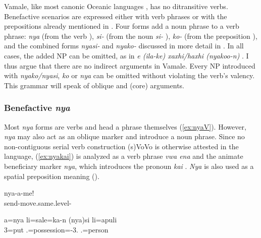 Vamale, like most canonic Oceanic languages \parencite[510]{ross_morphosyntactic_2004}, has no ditransitive verbs. Benefactive scenarios are expressed either with verb phrases or with the prepositions already mentioned in . Four forms add a noun phrase to a verb phrase: \textit{nya}  (from the verb ), \textit{si-}  (from the noun \textit{si-} ), \textit{ko-}  (from the preposition ), and the combined forms \textit{nyasi-} and \textit{nyako-}  discussed in more detail in . In all cases, the added NP can be omitted, as in \textit{e (ila-ke) xaxhi/haxhi (nyakoo-n)} . I thus argue that there are no indirect arguments in Vamale. Every NP introduced with \textit{nyako/nyasi}, \textit{ko} or \textit{nya} can be omitted without violating the verb's valency. This grammar will speak of oblique and (core) arguments. %

\subsubsection{Benefactive \textit{nya}}
\label{ssec:benef_nya}

Most \textit{nya} forms are verbs and head a phrase themselves (\ref{ex:nyaV}). However, \textit{nya} may also act as an oblique marker and introduce a noun phrase. Since no non-contiguous serial verb construction (s)VoVo is otherwise attested in the language, (\ref{ex:nyakai}) is analyzed as a verb phrase \textit{vwa ena}  and the animate beneficiary marker \textit{nya}, which introduces the pronoun \textit{kai} . \textit{Nya} is also used as a spatial preposition meaning  ().
	
	\ea \label{ex:nyaV}
	\gll nya-a-me!\\
	 send-move.same.level-\\
	\glt {}
	\z
	
	
	\ea
	\gll a=nya li=sale=ka-n (nya)si li=apuli	\\
	 3=put .=possession=-3.  .=person\\
	\glt {}
	\z 
	
